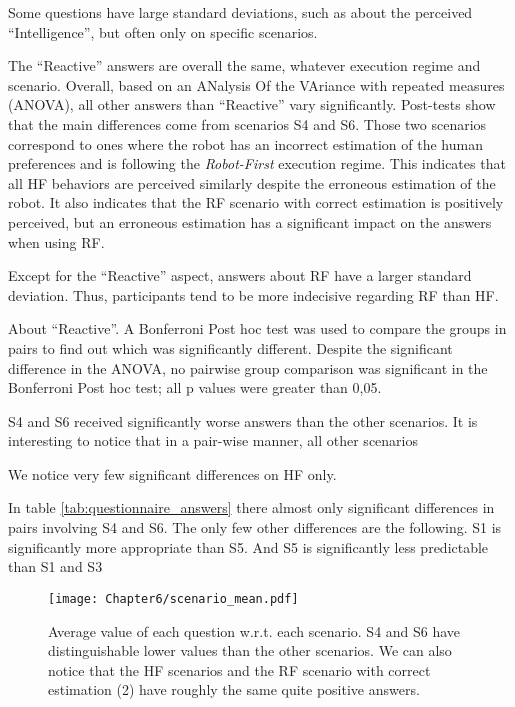 Some questions have large standard deviations, such as about the perceived ``Intelligence'', but often only on specific scenarios.

The ``Reactive'' answers are overall the same, whatever execution regime and scenario. 
Overall, based on an ANalysis Of the VAriance with repeated measures (ANOVA), all other answers than ``Reactive'' vary significantly. Post-tests show that the main differences come from scenarios S4 and S6. Those two scenarios correspond to ones where the robot has an incorrect estimation of the human preferences and is following the \textit{Robot-First} execution regime. This indicates that all HF behaviors are perceived similarly despite the erroneous estimation of the robot. It also indicates that the RF scenario with correct estimation is positively perceived, but an erroneous estimation has a significant impact on the answers when using RF.  

Except for the ``Reactive'' aspect, answers about RF have a larger standard deviation. Thus, participants tend to be more indecisive regarding RF than HF.

About ``Reactive''. A Bonferroni Post hoc test was used to compare the groups in pairs to find out which was significantly different.
Despite the significant difference in the ANOVA, no pairwise group comparison was significant in the Bonferroni Post hoc test; all p values were greater than 0,05. 

S4 and S6 received significantly worse answers than the other scenarios. It is interesting to notice that in a pair-wise manner, all other scenarios 

We notice very few significant differences on HF only.

In table \ref{tab:questionnaire_answers} there almost only significant differences in pairs involving S4 and S6. The only few other differences are the following. 
S1 is significantly more appropriate than S5. And S5 is significantly less predictable than S1 and S3

\begin{figure}[h]
    \texttt{[image: Chapter6/scenario\_mean.pdf]}
    \caption{Average value of each question w.r.t. each scenario. S4 and S6 have distinguishable lower values than the other scenarios. We can also notice that the HF scenarios and the RF scenario with correct estimation (2) have roughly the same quite positive answers.}
    \label{fig:scenario_mean}
\end{figure}

